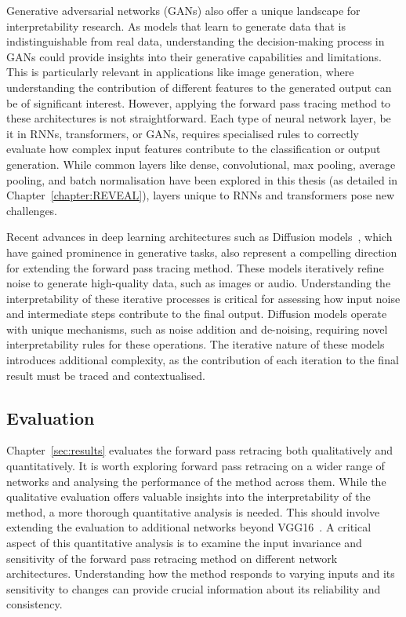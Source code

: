 Generative adversarial networks (GANs) also offer a unique landscape for interpretability research. As models that learn to generate data that is indistinguishable from real data, understanding the decision-making process in GANs could provide insights into their generative capabilities and limitations. This is particularly relevant in applications like image generation, where understanding the contribution of different features to the generated output can be of significant interest. However, applying the forward pass tracing method to these architectures is not straightforward. Each type of neural network layer, be it in RNNs, transformers, or GANs, requires specialised rules to correctly evaluate how complex input features contribute to the classification or output generation. While common layers like dense, convolutional, max pooling, average pooling, and batch normalisation have been explored in this thesis (as detailed in Chapter~\ref{chapter:REVEAL}), layers unique to RNNs and transformers pose new challenges. 

Recent advances in deep learning architectures such as 
Diffusion models~\cite{ho2020denoisingdiffusionprobabilisticmodels}, which have gained prominence in generative tasks, also represent a compelling direction for extending the forward pass tracing method. These models iteratively refine noise to generate high-quality data, such as images or audio. Understanding the interpretability of these iterative processes is critical for assessing how input noise and intermediate steps contribute to the final output. Diffusion models operate with unique mechanisms, such as noise addition and de-noising, requiring novel interpretability rules for these operations. The iterative nature of these models introduces additional complexity, as the contribution of each iteration to the final result must be traced and contextualised. 

\subsection{Evaluation}
\label{evl}
Chapter~\ref{sec:results} evaluates the forward pass retracing both qualitatively and quantitatively. It is worth exploring forward pass retracing on a wider range of networks and analysing the performance of the method across them. While the qualitative evaluation offers valuable insights into the interpretability of the method, a more thorough quantitative analysis is needed. This should involve extending the evaluation to additional networks beyond VGG16~\cite{SimonyanZ14a}. A critical aspect of this quantitative analysis is to examine the input invariance and sensitivity of the forward pass retracing method on different network architectures. Understanding how the method responds to varying inputs and its sensitivity to changes can provide crucial information about its reliability and consistency.

